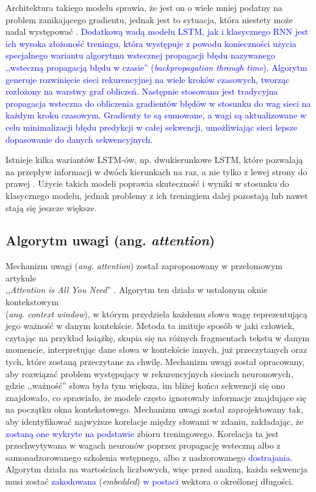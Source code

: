 \documentclass[data-science]{agh-wi} %
\begin{document}
Architektura takiego modelu sprawia, że jest on o wiele mniej podatny na problem zanikającego gradientu, jednak jest to sytuacja, która niestety może nadal występować \cite{vanishing_gradient}. \textcolor{blue}{Dodatkową wadą modelu LSTM, jak i klasycznego RNN jest ich wysoka złożoność treningu, która występuje z powodu konieczności użycia specjalnego wariantu algorytmu wstecznej propagacji błędu nazywanego ,,wsteczną propagacją błędu w czasie'' (\textit{backpropagation through time}). Algorytm generuje rozwinięcie sieci rekurencyjnej na wiele kroków czasowych, tworząc rozłożony na warstwy graf obliczeń. Następnie stosowana jest tradycyjna propagacja wsteczna do obliczenia gradientów błędów w stosunku do wag sieci na każdym kroku czasowym. Gradienty te są sumowane, a wagi są aktualizowane w celu minimalizacji błędu predykcji w całej sekwencji, umożliwiając sieci lepsze dopasowanie do danych sekwencyjnych.}

Istnieje kilka wariantów LSTM-ów, np. dwukierunkowe LSTM, które pozwalają na przepływ informacji w dwóch kierunkach na raz, a nie tylko z lewej strony do prawej \cite{bi_lstm}. Użycie takich modeli poprawia skuteczność i wyniki w stosunku do klasycznego modelu, jednak problemy z ich treningiem dalej pozostają lub nawet stają się jeszcze większe.

\subsection{Algorytm uwagi (ang. \textit{attention})}
\label{sec:attention}
Mechanizm uwagi (\textit{ang. attention}) został zaproponowany w przełomowym artykule \\,,\textit{Attention is All You Need}'' \cite{attention}. Algorytm ten działa w ustalonym oknie kontekstowym \\ (\textit{ang. context window}), w którym przydziela każdemu słowu wagę reprezentującą jego ważność w danym kontekście. Metoda ta imituje sposób w jaki człowiek, czytając na przykład książkę, skupia się na różnych fragmentach tekstu w danym momencie, interpretując dane słowa w kontekście innych, już przeczytanych oraz tych, które zostaną przeczytane za chwilę. Mechanizm uwagi został opracowany, aby rozwiązać problem występujący w rekurencyjnych sieciach neuronowych, gdzie ,,ważność'' słowa była tym większa, im bliżej końca sekwencji się ono znajdowało, co sprawiało, że modele często ignorowały informacje znajdujące się \\ na początku okna kontekstowego. Mechanizm uwagi został zaprojektowany tak, aby identyfikować najwyższe korelacje między słowami w zdaniu, zakładając, że \textcolor{blue}{zostaną one wykryte na podstawie} zbioru treningowego. Korelacja ta jest przechwytywana w wagach neuronów poprzez propagację wsteczną albo z samonadzorowanego szkolenia wstępnego, albo z nadzorowanego \textcolor{blue}{dostrajania}. Algorytm działa na wartościach liczbowych, więc przed analizą, każda sekwencja musi zostać \textcolor{blue}{zakodowana} (\textit{embedded}) \textcolor{blue}{w postaci} wektora o określonej długości.
\end{document}
